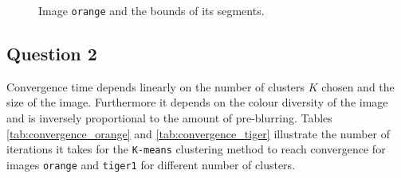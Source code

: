 {\begin{minipage}{\linewidth}
\begin{minipage}{0.45\linewidth}
\begin{figure}[H]
      \caption{Image \texttt{orange} and the bounds of its segments.}
      \label{fig:orange_segmented_bounds}
    \end{figure}
  \end{minipage}
\end{minipage}
}


\subsection{Question 2}
Convergence time depends linearly on the number of clusters $K$ chosen and the
size of the image.
Furthermore it depends on the colour diversity of the image and is inversely
proportional to the amount of pre-blurring.
Tables \ref{tab:convergence_orange} and \ref{tab:convergence_tiger} illustrate
the number of iterations it takes for the \texttt{K-means} clustering method to
reach convergence for images \texttt{orange} and \texttt{tiger1}
for different number of clusters.

